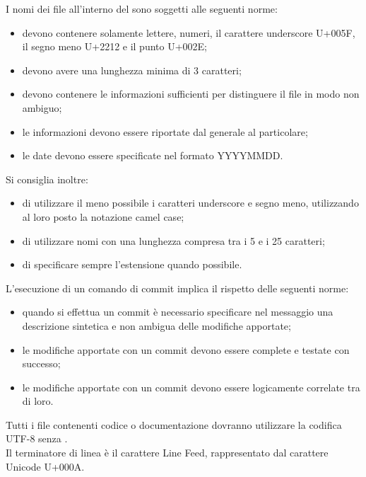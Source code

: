 					I nomi dei file all’interno del  sono soggetti alle seguenti norme:
					\begin{itemize}
						\item devono contenere solamente lettere, numeri, il carattere underscore U+005F, il segno meno U+2212 e il punto U+002E;
						\item devono avere una lunghezza minima di 3 caratteri;
						\item devono contenere le informazioni sufficienti per distinguere il file in modo non ambiguo;
						\item le informazioni devono essere riportate dal generale al particolare;
						\item le date devono essere specificate nel formato YYYYMMDD.
					\end{itemize}
					Si consiglia inoltre:
					\begin{itemize}
						\item di utilizzare il meno possibile i caratteri underscore e segno meno, utilizzando al loro posto la notazione camel case;
						\item di utilizzare nomi con una lunghezza compresa tra i 5 e i 25 caratteri;
						\item di specificare sempre l’estensione quando possibile.
					\end{itemize}
					L'esecuzione di un comando di commit implica il rispetto delle seguenti norme:
					\begin{itemize}
						\item quando si effettua un commit è necessario specificare nel messaggio una descrizione sintetica e non ambigua delle modifiche apportate;
						\item le modifiche apportate con un commit devono essere complete e testate con successo;
						\item le modifiche apportate con un commit devono essere logicamente correlate tra di loro.
					\end{itemize}
				\label{sec:CodificaFile}
					Tutti i file contenenti codice o documentazione dovranno utilizzare la codifica UTF-8 senza .\\
					Il terminatore di linea è il carattere Line Feed, rappresentato dal carattere Unicode U+000A.

